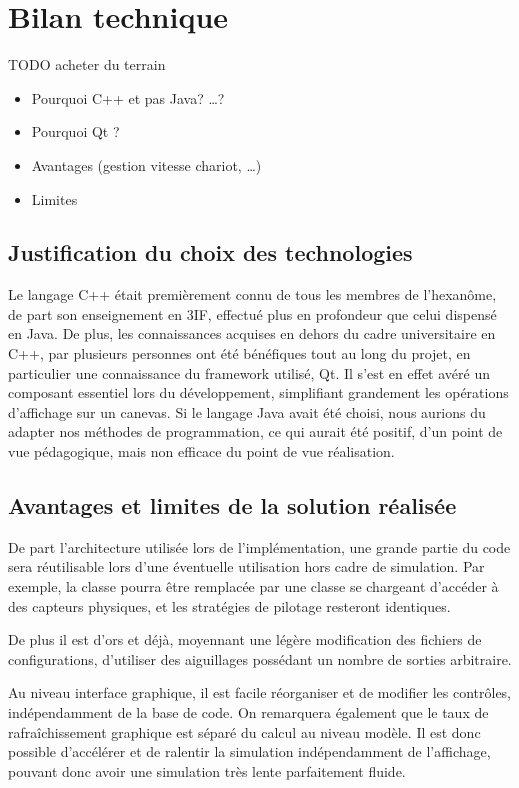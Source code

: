 \newcommand{\h}{\unit{h}}

\section{Bilan technique}
{\huge TODO acheter du terrain}
\begin{itemize}
\item Pourquoi C++ et pas Java? \ldots ?
\item Pourquoi Qt ?
\item Avantages (gestion vitesse chariot, \ldots)
\item Limites
\end{itemize}
\subsection{Justification du choix des technologies}
Le langage C++ était premièrement connu de tous les membres de l'hexanôme, de part son enseignement en 3IF, effectué plus en profondeur que celui dispensé en Java.
De plus, les connaissances acquises en dehors du cadre universitaire en C++, par plusieurs personnes ont été bénéfiques tout au long du projet, en particulier une connaissance du framework utilisé, Qt. Il s'est en effet avéré un composant essentiel lors du développement, simplifiant grandement les opérations d'affichage sur un canevas. Si le langage Java avait été choisi, nous aurions du adapter nos méthodes de programmation, ce qui aurait été positif, d'un point de vue pédagogique, mais non efficace du point de vue réalisation.

\subsection{Avantages et limites de la solution réalisée}
De part l'architecture utilisée lors de l'implémentation, une grande partie du code sera réutilisable lors d'une éventuelle utilisation hors cadre de simulation. Par exemple, la classe  pourra être remplacée par une classe se chargeant d'accéder à des capteurs physiques, et les stratégies de pilotage resteront identiques.

De plus il est d'ors et déjà, moyennant une légère modification des fichiers de configurations, d'utiliser des aiguillages possédant un nombre de sorties arbitraire.

Au niveau interface graphique, il est facile réorganiser et de modifier les contrôles, indépendamment de la base de code.
On remarquera également que le taux de rafraîchissement graphique est séparé du calcul au niveau modèle. Il est donc possible d'accélérer et de ralentir la simulation indépendamment de l'affichage, pouvant donc avoir une simulation très lente parfaitement fluide.

